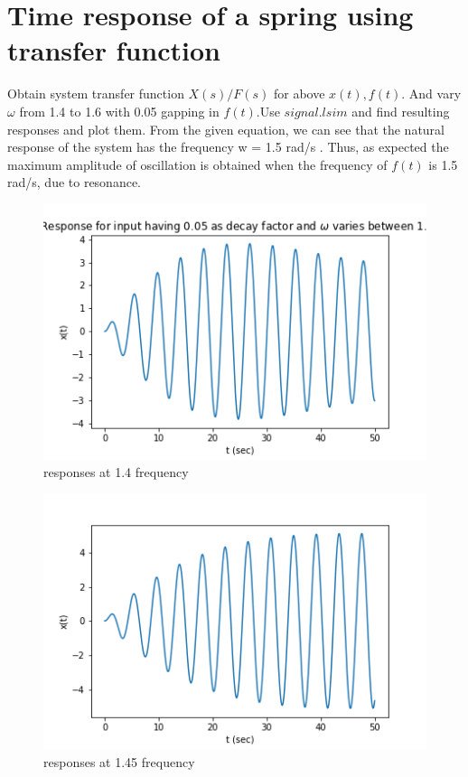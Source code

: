 \documentclass[11pt, a4paper]{article}
\begin{document}
\section{Time response of a spring using transfer function}
Obtain system transfer function $X(s)/F(s)$ for above $x(t),f(t)$. And vary $\omega$ from 1.4 to 1.6 with 0.05 gapping in $f(t)$.Use $signal.lsim$ and find resulting responses and plot them.
From the given equation, we can see that the natural response of the system has the frequency w = 1.5 rad/s . Thus, as expected the maximum amplitude of oscillation is obtained when the frequency of $f(t)$ is 1.5 rad/s, due to resonance.
\begin{figure}[!tbh]
  \centering
  \includegraphics[scale=0.5]{wvary1.4.png}
  \caption{responses at 1.4 frequency} 
  \label{fig:fig3}
\end{figure}
\begin{figure}[!tbh]
  \centering
  \includegraphics[scale=0.5]{wvary1.45.png}
  \caption{responses at 1.45 frequency} 
  \label{fig:fig4}
\end{figure}
\end{document}
